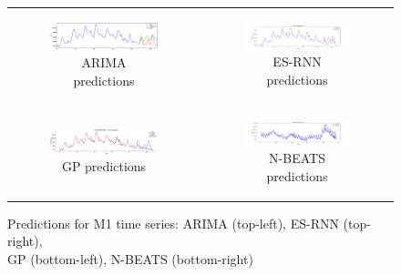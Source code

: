 \documentclass{article}
\begin{document}
\begin{figure}[!h]
  \centering
  \begin{tabular}[c]{cc}
    \begin{subfigure}[c]{0.6\textwidth}
      \includegraphics[width=\textwidth]{M1_ARIMA.eps}
      \caption{ARIMA predictions}
      \label{fig:M1stackpred1}
    \end{subfigure}&
    \begin{subfigure}[c]{0.6\textwidth}
      \includegraphics[width=\textwidth]{M1_esrnn_time_series.png}
      \caption{ES-RNN predictions}
      \label{fig:M1stackpred2}
    \end{subfigure}\\
    \begin{subfigure}[c]{0.5\textwidth}
      \includegraphics[width=\textwidth]{M1_GP_time_series.eps}
      \caption{GP predictions}
      \label{fig:M1stackpred3}
    \end{subfigure}&
    \begin{subfigure}[c]{0.6\textwidth}
      \includegraphics[width=\textwidth]{M1_nbeats_time_series.png}
      \caption{N-BEATS predictions}
      \label{fig:M1stackpred4}
    \end{subfigure}\\
  \end{tabular}    
  \caption{Predictions for M1 time series: ARIMA (top-left), ES-RNN (top-right), \\ GP (bottom-left), N-BEATS (bottom-right)}
  \label{fig:M1stackpred}
\end{figure}
\end{document}
